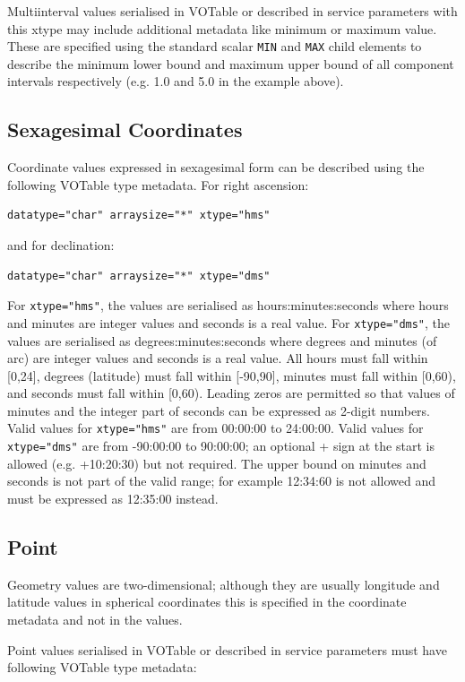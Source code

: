\documentclass[11pt,letter]{ivoa}
\begin{document}
Multiinterval values serialised in VOTable or described in service parameters
with this xtype may include additional metadata like minimum
or maximum value. These are specified using the standard scalar \verb|MIN| and
\verb|MAX| child elements to describe the minimum lower bound and maximum
upper bound of all component intervals respectively (e.g. 1.0 and 5.0 in the example
above).

\subsection{Sexagesimal Coordinates}
Coordinate values expressed in sexagesimal form can be described using the
following VOTable type metadata. For right ascension:

\begin{verbatim}
datatype="char" arraysize="*" xtype="hms"
\end{verbatim}
\noindent and for declination:
\begin{verbatim}
datatype="char" arraysize="*" xtype="dms"
\end{verbatim}

For \verb|xtype="hms"|, the values are serialised as hours:minutes:seconds where hours
and minutes are integer values and seconds is a real value. For \verb|xtype="dms"|, the values
are serialised as degrees:minutes:seconds where degrees and minutes (of arc) are integer
values and seconds is a real value. All hours must fall within [0,24], degrees
(latitude) must fall within [-90,90], minutes must fall within [0,60), and seconds
must fall within [0,60). Leading zeros are permitted so that values of minutes and the integer
part of seconds can be expressed as 2-digit numbers. Valid values for \verb|xtype="hms"| are
from 00:00:00 to 24:00:00.
Valid values for \verb|xtype="dms"| are from -90:00:00 to 90:00:00; an optional + sign at
the start is allowed (e.g. +10:20:30) but not required. The upper bound on minutes
and seconds is not part of the valid range; for example 12:34:60 is not allowed and must
be expressed as 12:35:00 instead.

\subsection{Point}
Geometry values are two-dimensional; although they are usually longitude and
latitude values in spherical coordinates this is specified in the coordinate
metadata and not in the values.

Point values serialised in VOTable or described in service parameters must have following
VOTable type metadata:
\end{document}
